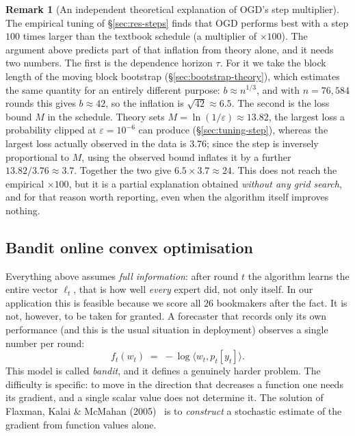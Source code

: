 \documentclass[12pt,a4paper,oneside]{report}
\renewcommand{\_}{\oldunderscore\allowbreak}
\theoremstyle{definition}
\theoremstyle{plain}
\theoremstyle{definition}   %
\newtheorem{remark}[theorem]{Remark}
\begin{document}
\begin{remark}[An independent theoretical explanation of OGD's step multiplier]
The empirical tuning of \S\ref{sec:res-steps} finds that OGD performs best with a step $100$
times larger than the textbook schedule (a multiplier of $\times100$). The argument above
predicts part of that inflation from theory alone, and it needs two numbers. The first is the
dependence horizon $\tau$. For it we take the block length of the moving block bootstrap
(\S\ref{sec:bootstrap-theory}), which estimates the same quantity for an entirely different
purpose: $b \approx n^{1/3}$, and with $n = 76{,}584$ rounds this gives $b \approx 42$, so the
inflation is $\sqrt{42}\approx 6.5$. The second is the loss bound $M$ in the schedule. Theory
sets $M = \ln(1/\varepsilon) \approx 13.82$, the largest loss a probability clipped at
$\varepsilon = 10^{-6}$ can produce (\S\ref{sec:tuning-step}), whereas the largest loss
actually observed in the data is $3.76$; since the step is inversely proportional to $M$, using
the observed bound inflates it by a further $13.82/3.76 \approx 3.7$. Together the two give
$6.5 \times 3.7 \approx 24$. This does not reach the empirical $\times100$,
but it is a partial explanation obtained \emph{without any grid search}, and for that reason
worth reporting, even when the algorithm itself improves nothing.
\end{remark}

\subsection{Bandit online convex optimisation}
\label{sec:bandit-theory}

Everything above assumes \emph{full information}: after round $t$ the algorithm learns the entire
vector $\ell_t$, that is how well \emph{every} expert did, not only itself. In our application
this is feasible because we score all $26$ bookmakers after the fact. It is not, however, to be
taken for granted. A forecaster that records only its own performance (and this is the usual
situation in deployment) observes a single number per round: \[ f_t(w_t) \;=\; -\log\langle
w_t, p_t[y_t]\rangle . \] This model is called \emph{bandit}, and it defines a genuinely harder
problem. The difficulty is specific: to move in the direction that decreases a function one
needs its gradient, and a single scalar value does not determine it. The solution of Flaxman,
Kalai \& McMahan (2005)~\cite{flaxman2005} is to \emph{construct} a stochastic estimate of the gradient from
function values alone.
\end{document}
